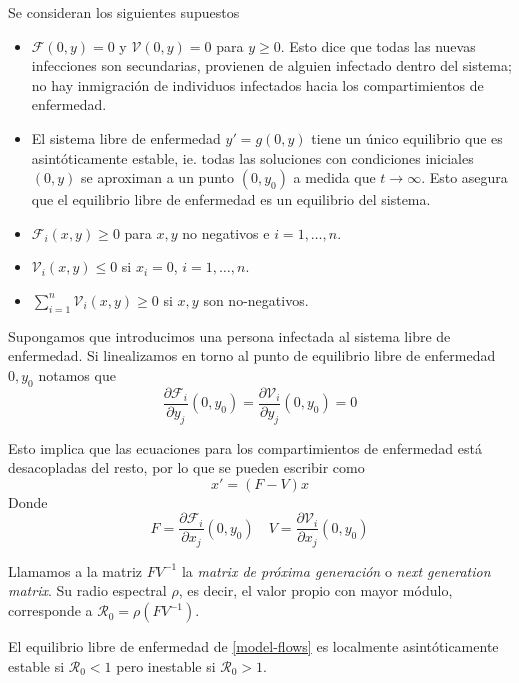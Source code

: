 Se consideran los siguientes supuestos 
\begin{itemize}
\item \(\mathcal{F}(0, y) = 0\) y \(\mathcal{V}(0, y) = 0\) para \(y \geq 0\). Esto dice que todas las nuevas infecciones son secundarias, provienen de alguien infectado dentro del sistema; no hay inmigración de individuos infectados hacia los compartimientos de enfermedad.
\item El sistema libre de enfermedad \(y' = g(0,y) \) tiene un único equilibrio que es asintóticamente estable, ie. todas las soluciones con condiciones iniciales \((0,y)\) se aproximan a un punto \((0, y_0)\) a medida que \(t \to \infty\). Esto asegura que el equilibrio libre de enfermedad es un equilibrio del sistema.
\item \(\mathcal{F}_i(x,y) \geq 0\) para \(x,y\) no negativos e \(i = 1, \dots, n\).
\item \(\mathcal{V}_i(x,y) \leq 0\) si \(x_i = 0\), \(i = 1, \dots, n\).
\item \(\sum_{i=1}^n\mathcal{V}_i(x,y) \geq 0\) si \(x,y\) son no-negativos.
\end{itemize}

Supongamos que introducimos una persona infectada al sistema libre de enfermedad. Si linealizamos en torno al punto de equilibrio libre de enfermedad \(0, y_0\) notamos que 
\[
\frac{\partial \mathcal{F}_i}{\partial y_j} (0,y_0) = \frac{\partial \mathcal{V}_i}{\partial y_j} (0,y_0) = 0
\]

Esto implica que las ecuaciones para los compartimientos de enfermedad está desacopladas del resto, por lo que se pueden escribir como 
\[
x' = (F-V)x
\]
Donde 
\[
F = \frac{\partial \mathcal{F}_i}{\partial x_j}(0, y_0) \quad
V = \frac{\partial \mathcal{V}_i}{\partial x_j}(0, y_0) 
\]

Llamamos a la matriz \(FV^{-1}\) la \textit{matrix de próxima generación} o \textit{next generation matrix}. Su radio espectral \(\rho\), es decir, el valor propio con mayor módulo, corresponde a \(\mathcal{R}_0 = \rho(FV^{-1})\).

\begin{teo}
El equilibrio libre de enfermedad de \ref{model-flows} es localmente asintóticamente estable si \(\mathcal{R}_0 < 1\) pero inestable si \(\mathcal{R}_0 > 1\).
\end{teo}



